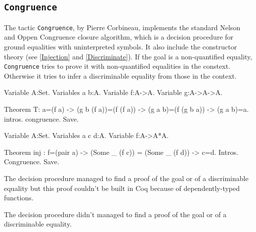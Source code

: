 
\subsection{\tt Congruence}
\label{Congruence}

The tactic {\tt Congruence}, by Pierre Corbineau, implements the standard Nelson and Oppen
Congruence closure algorithm, which is a decision procedure for ground
equalities with uninterpreted symbols. It also include the constructor theory
(see \ref{Injection} and \ref{Discriminate}).
If the goal is a non-quantified equality, {\tt Congruence} tries to
prove it with non-quantified equalities in the constext. Otherwise it
tries to infer a discriminable equality from those in the context.


\begin{coq_eval}
Variable A:Set.
Variables a b:A.
Variable f:A->A.
Variable g:A->A->A.
\end{coq_eval}

\begin{coq_example*}
Theorem T: a=(f a) -> (g b (f a))=(f (f a)) -> (g a b)=(f (g b a)) -> (g a b)=a.
intros.
congruence.
Save.
\end{coq_example*}

\begin{coq_eval}
Variable A:Set.
Variables a c d:A.
Variable f:A->A*A.
\end{coq_eval}

\begin{coq_example*}
Theorem inj : f=(pair a) -> (Some _ (f c)) = (Some _ (f d)) -> c=d.                             
Intros.
Congruence.
Save.
\end{coq_example*}





\begin{ErrMsgs}
  \item {}
    The decision procedure managed to find a proof of the goal or of
    a discriminable equality but this proof couldn't be built in Coq
    because of dependently-typed functions.
  \item {}
    The decision procedure didn't managed to find a proof of the goal or of
    a discriminable equality.
\end{ErrMsgs}

